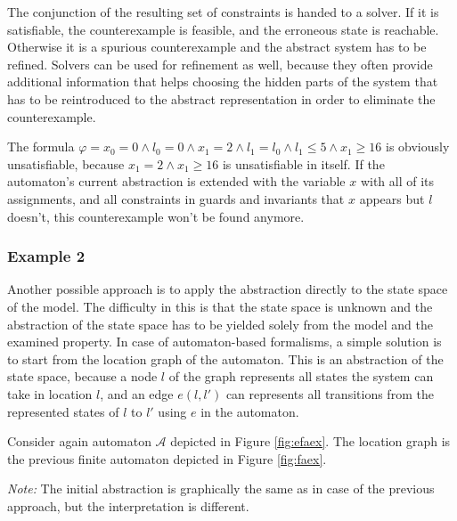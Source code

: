 The conjunction of the resulting set of constraints is handed to a solver. If it is satisfiable, the counterexample is feasible, and the erroneous state is reachable. Otherwise it is a spurious counterexample and the abstract system has to be refined. Solvers can be used for refinement as well, because they often provide additional information that helps choosing the hidden parts of the system that has to be reintroduced to the abstract representation in order to eliminate the counterexample.

\begin{example}
	The formula $\varphi = x_0=0 \wedge l_0=0 \wedge x_1=2 \wedge l_1=l_0 \wedge l_1 \leq 5 \wedge x_1 \geq 16$ is obviously unsatisfiable, because $x_1=2 \wedge x_1 \geq 16$ is unsatisfiable in itself. If the automaton's current abstraction is extended with the variable $x$ with all of its assignments, and all constraints in guards and invariants that $x$ appears but $l$ doesn't, this counterexample won't be found anymore.
\end{example}

\subsubsection{Example 2} \label{sec:cegarex2}

Another possible approach is to apply the abstraction directly to the state space of the model. The difficulty in this is that the state space is unknown and the abstraction of the state space has to be yielded solely from the model and the examined property. In case of automaton-based formalisms, a simple solution is to start from the location graph of the automaton. This is an abstraction of the state space, because a node $l$ of the graph represents all states the system can take in location $l$, and an edge $e(l,l')$ can represents all transitions from the represented states of $l$ to $l'$ using $e$ in the automaton.

 \begin{example}
 	Consider again automaton $\mathcal{A}$ depicted in Figure \ref{fig:efaex}. The location graph is the previous finite automaton depicted in Figure \ref{fig:faex}.
 	
 	\emph{Note:} The initial abstraction is graphically the same as in case of the previous approach, but the interpretation is different.
 \end{example}

